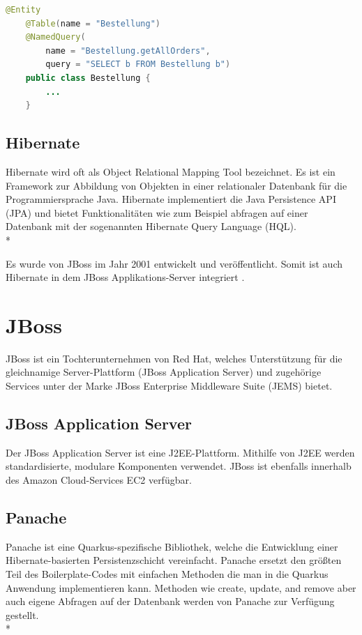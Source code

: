 \begin{lstlisting}[language=Java,caption=JPA Entity,label=lst:impl:foo]
    @Entity
    @Table(name = "Bestellung")
    @NamedQuery(
        name = "Bestellung.getAllOrders",
        query = "SELECT b FROM Bestellung b")
    public class Bestellung {
        ...
    }
\end{lstlisting}

\subsection{Hibernate}
\author{David Ignjatovic}

Hibernate wird oft als Object Relational Mapping Tool bezeichnet. Es ist ein Framework zur Abbildung von Objekten in einer relationaler Datenbank für die Programmiersprache Java.
Hibernate implementiert die Java Persistence API (JPA) und bietet Funktionalitäten wie zum Beispiel abfragen auf einer Datenbank mit der sogenannten Hibernate Query Language (HQL). \\*

Es wurde von JBoss im Jahr 2001 entwickelt und veröffentlicht. Somit ist auch Hibernate in dem JBoss Applikations-Server integriert .\cite{Hibernate}

\section{JBoss}
\author{David Ignjatovic}

JBoss ist ein Tochterunternehmen von Red Hat, welches Unterstützung für die gleichnamige Server-Plattform (JBoss Application Server) 
und zugehörige Services unter der Marke JBoss Enterprise Middleware Suite (JEMS) bietet. \cite{JBoss}

\subsection{JBoss Application Server}

Der JBoss Application Server ist eine J2EE-Plattform. Mithilfe von J2EE werden standardisierte, modulare Komponenten verwendet.
JBoss ist ebenfalls innerhalb des Amazon Cloud-Services EC2 verfügbar. \cite{JBoss}

\subsection{Panache}
\author{David Ignjatovic}

Panache ist eine Quarkus-spezifische Bibliothek, welche die Entwicklung einer Hibernate-basierten Persistenzschicht vereinfacht. 
Panache ersetzt den größten Teil des Boilerplate-Codes mit einfachen Methoden die man in die Quarkus Anwendung implementieren kann. 
Methoden wie create, update, and remove aber auch eigene Abfragen auf der Datenbank werden von Panache zur Verfügung gestellt. \\* \cite{Panache}

